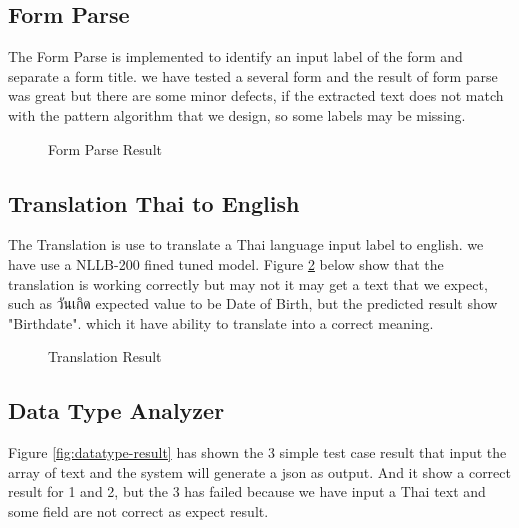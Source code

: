 \documentclass[12pt,oneside,openright,a4paper]{cpe-english-project}
\begin{document}
\subsection{Form Parse}
The Form Parse is implemented to identify an input label of the form and separate a form title. we have tested a several form and the result of form parse was 
great but there are some minor defects, if the extracted text does not match with the pattern algorithm that we design, so some labels may be missing.

\begin{figure}[H]
\centering
{}
\caption{Form Parse Result}\label{fig:Form-Parse}
\end{figure}

\subsection{Translation Thai to English}
The Translation is use to translate a Thai language input label to english. we have use a NLLB-200 fined tuned model. Figure \ref{fig:trans-result} below show that the translation is working correctly but may not it may get a text that we expect, such as \textthai{วันเกิด} expected value to be Date of Birth, but the predicted result show "Birthdate". which it have ability to translate into a correct meaning.

\begin{figure}[H]
\centering
{}
\caption{Translation Result}\label{fig:trans-result}
\end{figure}

\subsection{Data Type Analyzer}
Figure \ref{fig:datatype-result} has shown the 3 simple test case result that input the array of text and the system will generate a json as output. And it show a correct result for 1 and 2, but the 3 has failed because we have input a Thai text and some field are not correct as expect result.
\end{document}
